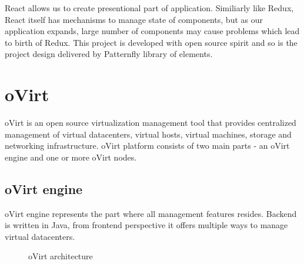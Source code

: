 React allows us to create presentional part of application. Similiarly like Redux, React itself has mechanisms to manage state of components, but as our application expands, large number of components may cause problems which lead to birth of Redux. This project is developed with open source spirit and so is the project design delivered by Patternfly\cite{Patternfly} library of elements.


\chapter{oVirt}
oVirt is an open source virtualization management tool that provides centralized management of virtual datacenters, virtual hosts, virtual machines, storage and networking infrastructure. oVirt platform consists of two main parts - an oVirt engine and one or more oVirt nodes.

\section{oVirt engine}
oVirt engine represents the part where all management features resides. Backend is written in Java, from frontend perspective it offers multiple ways to manage virtual datacenters.

\begin{figure}[h]
\caption{oVirt architecture}
\label{vector}
\end{figure}

